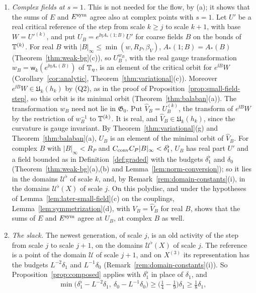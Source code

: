 \begin{remark}
\begin{enumerate}[label=(\alph*)]
\item \emph{Complex fields at $s=1$.} This is not needed for the flow, by (a); it shows that the sums of $E$ and $E^{\rm sym}$ agree also at complex points with $s=1$. Let $U'$ be a real critical reference of the step from scale $k\ge j$ to scale $k+1$, with base $W=U'^{(k)}$, and put $U_B=e^{\ii\eta A_*(1;B)}U'$ for coarse fields $B$ on the bonds of $\mathbb T^{(k)}$. For real $B$ with $|B|_\infty\le\min(w,R_P,\beta_V)$, $A_*(1;B)=A_*(B)$ (Theorem~\ref{thm:weak-bg}(c)), so $U_B^{w_B}$, with the real gauge transformation $w_B=\mathsf w_k(e^{\ii\eta A_*(B)})$ of $\mathbb T_\eta$, is an element of the critical orbit for $e^{\ii B}W$ (Corollary~\ref{cor:analytic}, Theorem~\ref{thm:variational}(c)). Moreover $e^{\ii B}W\in\mathfrak U_k(h_k)$ by (Q2), as in the proof of Proposition~\ref{prop:small-field-step}, so this orbit is its minimal orbit (Theorem~\ref{thm:balaban}(a)). The transformation $w_B$ need not lie in $\mathfrak G_0$. Put $\hat V_B=U_B^{(k)}$, the transform of $e^{\ii B}W$ by the restriction of $w_B^{-1}$ to $\mathbb T^{(k)}$. It is real, and $\hat V_B\in\mathfrak U_k(h_k)$, since the curvature is gauge invariant. By Theorem~\ref{thm:variational}(g) and Theorem~\ref{thm:balaban}(a), $U_B$ is an element of the minimal orbit of $\hat V_B$. For complex $B$ with $|B|_\infty<R_P$ and $C_{\rm conv}C_P|B|_\infty<\delta_1^\flat$, $U_B$ has real part $U'$ and a field bounded as in Definition~\ref{def:graded} with the budgets $\delta_1^\flat$ and $\delta_0$ (Theorem~\ref{thm:weak-bg}(a),(b) and Lemma~\ref{lem:norm-conversion}); so it lies in the domains $\mathcal U^\flat$ of scale $k$, and, by Remark~\ref{rem:domain-constants}(i), in the domains $\mathcal U^\flat(X)$ of scale $j$. On this polydisc, and under the hypotheses of Lemma~\ref{lem:later-small-field}(c) on the couplings, Lemma~\ref{lem:symmetrization}(d), with $V_B=\hat V_B$ for real $B$, shows that the sums of $E$ and $E^{\rm sym}$ agree at $U_B$, at complex $B$ as well.
\item \emph{The slack.} The newest generation, of scale $j$, is an old activity of the step from scale $j$ to scale $j+1$, on the domains $\mathcal U^\flat(X)$ of scale $j$. The reference is a point of the domain $\mathcal U$ of scale $j+1$, and on $X^{(3)}$ its representation has the budgets $L^{-2}\delta_1$ and $L^{-1}\delta_0$ (Remark~\ref{rem:domain-constants}(i)). So Proposition~\ref{prop:composed} applies with $\delta_1^\flat$ in place of $\delta_1$, and
\[
\min\big(\delta_1^\flat-L^{-2}\delta_1,\ \delta_0-L^{-1}\delta_0\big)\ge\big(\tfrac14-\tfrac19\big)\delta_1\ge\tfrac18\delta_1,
\]
\end{enumerate}
\end{remark}

